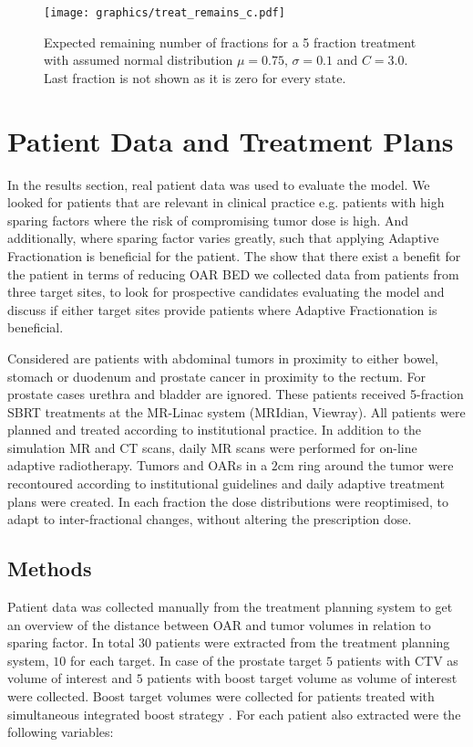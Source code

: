 \documentclass[\relativeRoot/ada.tex]{subfiles}
\begin{document}
\begin{figure}[!htb]
    \centering
    \texttt{[image: graphics/treat\_remains\_c.pdf]}
    \caption{Expected remaining number of fractions for a 5 fraction treatment with assumed normal distribution $\mu=0.75$, $\sigma=0.1$ and $C=3.0$. Last fraction is not shown as it is zero for every state.}
    \label{fig:treat_remains_c}
\end{figure}

\section{Patient Data and Treatment Plans}
In the results section, real patient data was used to evaluate the model. We looked for patients that are relevant in clinical practice e.g. patients with high sparing factors where the risk of compromising tumor dose is high. And additionally, where sparing factor varies greatly, such that applying Adaptive Fractionation is beneficial for the patient. The show that there exist a benefit for the patient in terms of reducing OAR BED we collected data from patients from three target sites, to look for prospective candidates evaluating the model and discuss if either target sites provide patients where Adaptive Fractionation is beneficial.

Considered are patients with abdominal tumors in proximity to either bowel, stomach or duodenum and prostate cancer in proximity to the rectum. For prostate cases urethra and bladder are ignored. These patients received 5-fraction SBRT treatments at the MR-Linac system (MRIdian, Viewray). All patients were planned and treated according to institutional practice. In addition to the simulation MR and CT scans, daily MR scans were performed for on-line adaptive radiotherapy. Tumors and OARs in a $2$cm ring around the tumor were recontoured according to institutional guidelines and daily adaptive treatment plans were created. In each fraction the dose distributions were reoptimised, to adapt to inter-fractional changes, without altering the prescription dose.


\subsection{Methods}
Patient data was collected manually from the treatment planning system to get an overview of the distance between OAR and tumor volumes in relation to sparing factor. In total $30$ patients were extracted from the treatment planning system, $10$ for each target. In case of the prostate target $5$ patients with CTV as volume of interest and $5$ patients with boost target volume as volume of interest were collected. Boost target volumes were collected for patients treated with simultaneous integrated boost strategy \cite{orlandi_sib_clinical} \cite{mohan_sib}. For each patient also extracted were the following variables:
\end{document}
